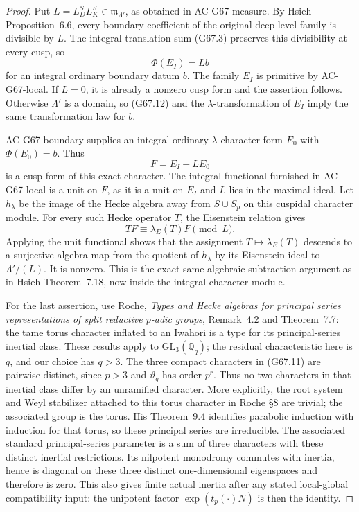 \begin{proof}
Put $L=L_D^S L_K^S\in\mathfrak m_{\Lambda'}$, as obtained in
AC-G67-measure.  By Hsieh Proposition~6.6, every boundary
coefficient of the original deep-level family is divisible
by $L$.  The integral translation sum (G67.3) preserves this
divisibility at every cusp, so
\[
                      \Phi(E_I)=L b                       \tag{G67.12}
\]
for an integral ordinary boundary datum $b$.
The family $E_I$ is primitive by AC-G67-local.
If $L=0$, it is already a nonzero cusp form and the assertion
follows.  Otherwise $\Lambda'$ is a domain, so (G67.12) and
the $\lambda$-transformation of $E_I$ imply the same
transformation law for $b$.

AC-G67-boundary supplies an integral ordinary
$\lambda$-character form $E_0$ with $\Phi(E_0)=b$.  Thus
\[
                       F=E_I-L E_0                       \tag{G67.13}
\]
is a cusp form of this exact character.  The integral
functional furnished in AC-G67-local is a unit on $F$, as
it is a unit on $E_I$ and $L$ lies in the maximal ideal.
Let $h_\lambda$ be the image of the Hecke algebra away from
$S\cup S_p$ on this cuspidal character module.  For every
such Hecke operator $T$, the Eisenstein relation gives
\[
       T F\equiv\lambda_E(T)F\pmod{L}.
\]
Applying the unit functional shows that the assignment
$T\mapsto\lambda_E(T)$ descends to a surjective algebra
map from the quotient of $h_\lambda$ by its Eisenstein
ideal to $\Lambda'/(L)$.  It is nonzero.  This is the exact
same algebraic subtraction argument as in Hsieh
Theorem~7.18, now inside the integral character module.

For the last assertion, use Roche, \emph{Types and Hecke
algebras for principal series representations of split
reductive $p$-adic groups}, Remark~4.2 and Theorem~7.7:
the tame torus character inflated to an Iwahori is a type
for its principal-series inertial class.  These results
apply to $\mathrm{GL}_3(\mathbb Q_q)$; the residual
characteristic here is $q$, and our choice has $q>3$.
The three compact characters in (G67.11) are pairwise
distinct, since $p>3$ and $\vartheta_q$ has order $p^r$.
Thus no two characters in that inertial class differ by
an unramified character.  More explicitly, the root system
and Weyl stabilizer attached to this torus character in
Roche \S8 are trivial; the associated group is the torus.
His Theorem~9.4 identifies parabolic induction with induction
for that torus, so these principal series are irreducible.
The associated standard principal-series
parameter is a sum of three characters with these distinct
inertial restrictions.  Its nilpotent monodromy commutes
with inertia, hence is diagonal on these three distinct
one-dimensional eigenspaces and therefore is zero.
This also gives finite actual inertia after any stated
local-global compatibility input: the unipotent factor
$\exp(t_p(\cdot)N)$ is then the identity.
\end{proof}

